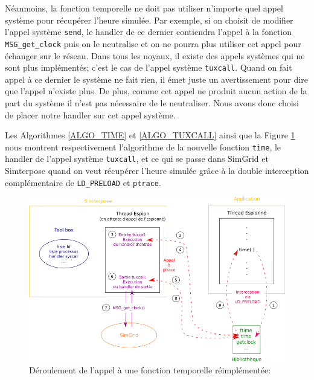 Néanmoins, la fonction temporelle ne doit pas utiliser n'importe quel appel système pour récupérer l'heure simulée. Par exemple, si on choisit de modifier l'appel système \texttt{send}, le handler de ce dernier contiendra l'appel à la fonction \texttt{MSG\_get\_clock} puis on le neutralise et on ne pourra plus utiliser cet appel pour échanger sur le réseau. Dans tous les noyaux, il existe des appels systèmes qui ne sont plus implémentés; c'est le cas de l'appel système \texttt{tuxcall}. Quand on fait appel à ce dernier le système ne fait rien, il émet juste un avertissement pour dire que l'appel n'existe plus. De plus, comme cet appel ne produit aucun action de la part du système il n'est pas nécessaire de le neutraliser. Nous avons donc choisi de placer notre handler sur cet appel système.

Les Algorithmes \ref{ALGO_TIME} et \ref{ALGO_TUXCALL} ainsi que la Figure \ref{time_interception} nous montrent respectivement l'algorithme de la nouvelle fonction \texttt{time}, le handler de l'appel système \texttt{tuxcall}, et ce qui se passe dans SimGrid et Simterpose quand on veut récupérer l'heure simulée grâce à la double interception complémentaire de \texttt{LD\_PRELOAD} et \texttt{ptrace}.

\begin{figure}[H]
  \centering
  \includegraphics[scale=0.7]{Pictures/png/Open_pandor}
  \caption[Déroulement de l'appel à une fonction temporelle réimplémentée]{Déroulement de l'appel à une fonction temporelle réimplémentée:}
  \label{time_interception}
\end{figure}

